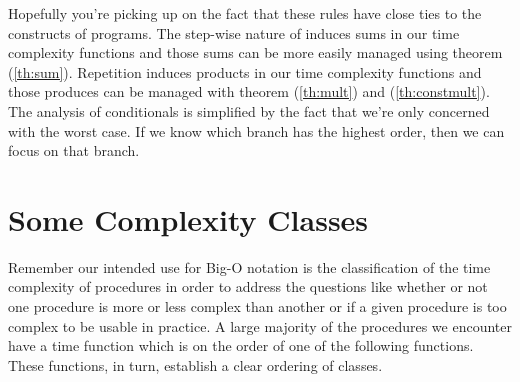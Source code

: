 \documentclass[]{tufte-handout}
\begin{document}
Hopefully you're picking up on the fact that these rules have close ties to the constructs of programs. The step-wise nature of induces sums in our time complexity functions and those sums can be more easily managed using theorem (\ref{th:sum}). Repetition induces products in our time complexity functions and those produces can be managed with theorem (\ref{th:mult}) and (\ref{th:constmult}). The analysis of conditionals is simplified by the fact that we're only concerned with the worst case. If we know which branch has the highest order, then we can focus on that branch. 

\section{Some Complexity Classes}

Remember our intended use for Big-O notation is the classification of the time complexity of procedures in order to address the questions like whether or not one procedure is more or less complex than another or if a given procedure is too complex to be usable in practice. A large majority of the procedures we encounter have a time function which is on the order of one of the following functions. These functions, in turn, establish a clear ordering of classes.
\end{document}
